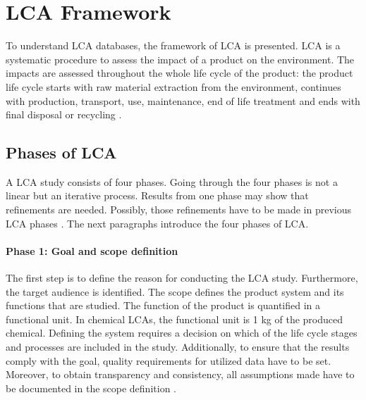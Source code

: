 \label{chap:LCA}
\section{\acl{LCA} Framework}
\label{chap:LCA-framework}
To understand \acf{LCA} databases, the framework of \ac{LCA} is presented. \ac{LCA} is a systematic procedure to assess the impact of a product on the environment. The impacts are assessed throughout the whole life cycle of the product: the product life cycle starts with raw material extraction from the environment, continues with production, transport, use, maintenance, end of life treatment and ends with final disposal or recycling \cite{InternationalOrganizationforStandardization.2006}.

\subsection{Phases of \acl{LCA}}
A \ac{LCA} study consists of four phases. Going through the four phases is not a linear but an iterative process. Results from one phase may show that refinements are needed. Possibly, those refinements have to be made in previous \ac{LCA} phases  \cite{InternationalOrganizationforStandardization.2006}. The next paragraphs introduce the four phases of \ac{LCA}.

\paragraph{Phase 1: Goal and scope definition} The first step is to define the reason for conducting the \ac{LCA} study. Furthermore, the target audience is identified. The scope defines the product system and its functions that are studied. The function of the product is quantified in a functional unit. In chemical \acp{LCA}, the functional unit is 1 kg of the produced chemical. Defining the system requires a decision on which of the life cycle stages and processes are included in the study. Additionally, to ensure that the results comply with the goal, quality requirements for utilized data have to be set. Moreover, to obtain transparency and consistency, all assumptions made have to be documented in the scope definition %
 \cite{InternationalOrganizationforStandardization.2006}.

